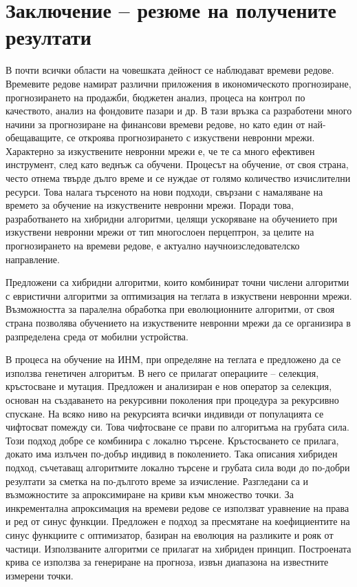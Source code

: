 \chapter*{Заключение – резюме на получените резултати}

В почти всички области на човешката дейност се наблюдават времеви редове. Времевите редове намират различни приложения в икономическото прогнозиране, прогнозирането на продажби, бюджетен анализ, процеса на контрол по качеството, анализ на фондовите пазари и др. В тази връзка са разработени много начини за прогнозиране на финансови времеви редове, но като един от най-обещаващите, се откроява прогнозирането с изкуствени невронни мрежи. Характерно за изкуствените невронни мрежи е, че те са много ефективен инструмент, след като веднъж са обучени. Процесът на обучение, от своя страна, често отнема твърде дълго време и се нуждае от голямо количество изчислителни ресурси. Това налага търсеното на нови подходи, свързани с намаляване на времето за обучение на изкуствените невронни мрежи. Поради това, разработването на хибридни алгоритми, целящи ускоряване на обучението при изкуствени невронни мрежи от тип многослоен перцептрон, за целите на прогнозирането на времеви редове, е актуално научноизследователско направление.

Предложени са хибридни алгоритми, които комбинират точни числени алгоритми с евристични алгоритми за оптимизация на теглата в изкуствени невронни мрежи. Възможността за паралелна обработка при еволюционните алгоритми, от своя страна позволява обучението на изкуствените невронни мрежи да се организира в разпределена среда от мобилни устройства.

В процеса на обучение на ИНМ, при определяне на теглата е предложено да се използва генетичен алгоритъм. В него се прилагат операциите – селекция, кръстосване и мутация. Предложен и анализиран е нов оператор за селекция, основан на създаването на рекурсивни поколения при процедура за рекурсивно спускане. На всяко ниво на рекурсията всички индивиди от популацията се чифтосват помежду си. Това чифтосване се прави по алгоритъма на грубата сила. Този подход добре се комбинира с локално търсене. Кръстосването се прилага, докато има излъчен по-добър индивид в поколението. Така описания хибриден подход, съчетаващ алгоритмите локално търсене и грубата сила води до по-добри резултати за сметка на по-дългото време за изчисление. Разгледани са и възможностите за апроксимиране на криви към множество точки. За инкрементална апроксимация на времеви редове се използват уравнение на права и ред от синус функции. Предложен е подход за пресмятане на коефициентите на синус функциите с оптимизатор, базиран на еволюция на разликите и рояк от частици. Използваните алгоритми се прилагат на хибриден принцип. Построената крива се използва за генериране на прогноза, извън диапазона на известните измерени точки.

